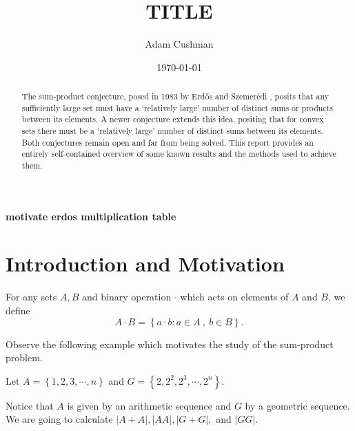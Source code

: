 \documentclass[12pt,reqno]{amsart}
\begin{document}
\title{\textbf{TITLE}} 


\author[Cushman]{Adam Cushman}
\address{Department of Mathematics\\
         Indiana University,
         Bloomington, IN 47405
         USA} 
\date{\today}

\begin{abstract}
The sum-product conjecture, posed in 1983 by Erd{\H{o}}s and Szemer{\'e}di \cite{erdos-szemeredi}, 
posits that any sufficiently large set must have a `relatively large' number
of distinct sums or products between its elements.
A newer conjecture extends this idea, positing that for convex sets there must be a `relatively large'
number of distinct sums between its elements. Both conjectures remain open and far from being solved.
This report provides an entirely self-contained overview of some known results and the methods
used to achieve them.
\end{abstract}

\maketitle


\textbf{motivate erdos multiplication table}

\section{Introduction and Motivation} 

For any sets \(A,B\) and binary operation \(\cdot \) which acts on elements of \(A\) and \(B\), we define
\[
    A \cdot  B = \left\{ a \cdot  b : a \in A~,~ b \in B \right\} 
.\]

Observe the following example which motivates the study of the sum-product problem.

Let \(A = \left\{ 1, 2, 3, \cdots, n \right\}\) and \(G = \left\{ 2, 2^{2}, 2^{3}, \cdots , 2^{n} \right\}\).

Notice that \(A\) is given by an arithmetic sequence and \(G\) by a geometric sequence.
We are going to calculate \(\left\lvert A+A \right\rvert , \left\lvert AA \right\rvert , \left\lvert G+G \right\rvert ,\) and \(\left\lvert GG \right\rvert \).
\end{document}
